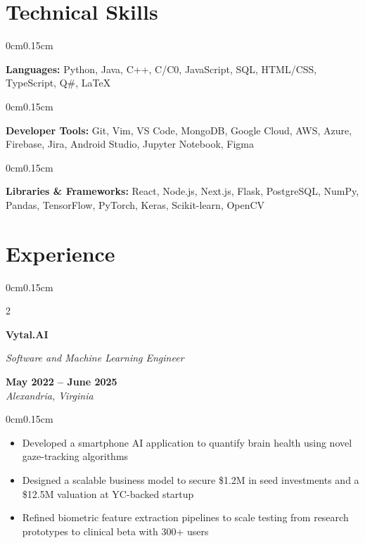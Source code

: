\documentclass[10pt, letterpaper]{article}
\newenvironment{highlights}{
    \begin{itemize}[topsep=0pt, parsep=0pt, partopsep=0pt, itemsep=0pt, leftmargin=0.6cm]
}{
    \end{itemize}
}
\newenvironment{onecolentry}{
    \begin{adjustwidth}{0cm}{0.15cm}
}{
    \end{adjustwidth}
}
\newenvironment{twocolentry}[2][]{
    \onecolentry
    \def\secondColumn{#2}
    \setcolumnwidth{\fill, 4cm}
    \begin{paracol}{2}
}{
    \switchcolumn \raggedleft \secondColumn
    \end{paracol}
    \endonecolentry
}
\begin{document}
    \vspace{0.05cm}

    \section{Technical Skills}
    \vspace{0.1cm}

    \begin{onecolentry}
        \textbf{Languages:} Python, Java, C++, C/C0, JavaScript, SQL, HTML/CSS, TypeScript, Q\#, LaTeX
    \end{onecolentry}
    \vspace{-0.1cm}
    \begin{onecolentry}
        \textbf{Developer Tools:} Git, Vim, VS Code, MongoDB, Google Cloud, AWS, Azure, Firebase, Jira, Android Studio, Jupyter Notebook, Figma
    \end{onecolentry}
    \vspace{-0.1cm}
    \begin{onecolentry}
        \textbf{Libraries \& Frameworks:} React, Node.js, Next.js, Flask, PostgreSQL, NumPy, Pandas, TensorFlow, PyTorch, Keras, Scikit-learn, OpenCV
    \end{onecolentry}

    \vspace{0.05cm}

    \section{Experience}
    \vspace{0.1cm}

    \begin{twocolentry}{\textbf{May 2022 -- June 2025} \\ \textit{Alexandria, Virginia}}
        \textbf{Vytal.AI}
        
        \textit{Software and Machine Learning Engineer}
    \end{twocolentry}
    \vspace{-0.15cm}
    \begin{onecolentry}
        \begin{highlights}
            \item Developed a smartphone AI application to quantify brain health using novel gaze-tracking algorithms
            \item Designed a scalable business model to secure \$1.2M in seed investments and a \$12.5M valuation at YC-backed startup
            \item Refined biometric feature extraction pipelines to scale testing from research prototypes to clinical beta with 300+ users
        \end{highlights}
    \end{onecolentry}
\end{document}
